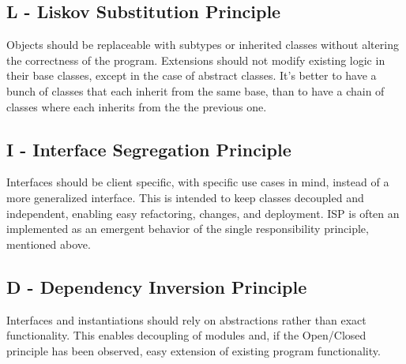 \documentclass{article}
\begin{document}
    \subsection*{L - Liskov Substitution Principle}
    Objects should be replaceable with subtypes or inherited classes without altering the correctness of the program. Extensions should not modify existing logic in their base classes, except in the case of abstract classes. It's better to have a bunch of classes that each inherit from the same base, than to have a chain of classes where each inherits from the the previous one.

    \subsection*{I - Interface Segregation Principle}
    Interfaces should be client specific, with specific use cases in mind, instead of a more generalized interface. This is intended to keep classes decoupled and independent, enabling easy refactoring, changes, and deployment. ISP is often an implemented as an emergent behavior of the single responsibility principle, mentioned above.

    \subsection*{D - Dependency Inversion Principle}
    Interfaces and instantiations should rely on abstractions rather than exact functionality. This enables decoupling of modules and, if the Open/Closed principle has been observed, easy extension of existing program functionality. 
\end{document}
